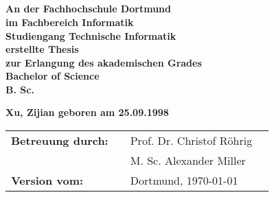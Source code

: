 \thispagestyle{empty}


\begin{center}
\textbf{\Large{~\titleDocument}}
\end{center}
\begin{verbatim}





\end{verbatim}
\begin{center}
\doublespacing
\textbf{\LARGE{\subjectDocument}}\\
\singlespacing
\end{center}
\begin{verbatim}

















\end{verbatim}
\begin{center}
\textbf{
    An der Fachhochschule Dortmund \\
    im Fachbereich Informatik \\
    Studiengang Technische Informatik \\
    erstellte Thesis \\
    zur Erlangung des akademischen Grades \\
    Bachelor of Science \\
    B. Sc. \\
}
\end{center}
\begin{center}
\textbf{\large{Xu, Zijian \linebreak
    geboren am 25.09.1998 
    }}
\end{center}
\begin{flushleft}
\begin{tabular}{llll}
\textbf{Betreuung durch:} & & Prof. Dr. Christof Röhrig &\\
    & & M. Sc. Alexander Miller &\\
\textbf{Version vom:} & & Dortmund, \today &\\
\end{tabular}
\end{flushleft}

